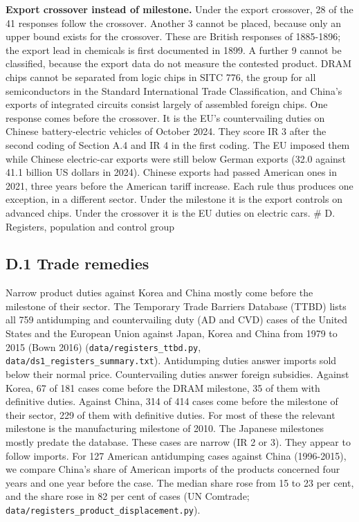\textbf{Export crossover instead of milestone.} Under the export
crossover, 28 of the 41 responses follow the crossover. Another 3 cannot
be placed, because only an upper bound exists for the crossover. These
are British responses of 1885-1896; the export lead in chemicals is
first documented in 1899. A further 9 cannot be classified, because the
export data do not measure the contested product. DRAM chips cannot be
separated from logic chips in SITC 776, the group for all semiconductors
in the Standard International Trade Classification, and China's exports
of integrated circuits consist largely of assembled foreign chips. One
response comes before the crossover. It is the EU's countervailing
duties on Chinese battery-electric vehicles of October 2024. They score
IR 3 after the second coding of Section A.4 and IR 4 in the first
coding. The EU imposed them while Chinese electric-car exports were
still below German exports (32.0 against 41.1 billion US dollars in
2024). Chinese exports had passed American ones in 2021, three years
before the American tariff increase. Each rule thus produces one
exception, in a different sector. Under the milestone it is the export
controls on advanced chips. Under the crossover it is the EU duties on
electric cars. \# D. Registers, population and control group

\hypertarget{d.1-trade-remedies}{%
\subsection*{D.1 Trade remedies}\label{d.1-trade-remedies}}

Narrow product duties against Korea and China mostly come before the
milestone of their sector. The Temporary Trade Barriers Database (TTBD)
lists all 759 antidumping and countervailing duty (AD and CVD) cases of
the United States and the European Union against Japan, Korea and China
from 1979 to 2015 (Bown 2016) (\texttt{data/\allowbreak{}registers\_\allowbreak{}ttbd.py},
\texttt{data/\allowbreak{}ds1\_\allowbreak{}registers\_\allowbreak{}summary.txt}). Antidumping duties answer
imports sold below their normal price. Countervailing duties answer
foreign subsidies. Against Korea, 67 of 181 cases come before the DRAM
milestone, 35 of them with definitive duties. Against China, 314 of 414
cases come before the milestone of their sector, 229 of them with
definitive duties. For most of these the relevant milestone is the
manufacturing milestone of 2010. The Japanese milestones mostly predate
the database. These cases are narrow (IR 2 or 3). They appear to follow
imports. For 127 American antidumping cases against China (1996-2015),
we compare China's share of American imports of the products concerned
four years and one year before the case. The median share rose from 15
to 23 per cent, and the share rose in 82 per cent of cases (UN Comtrade;
\texttt{data/\allowbreak{}registers\_\allowbreak{}product\_\allowbreak{}displacement.py}).

